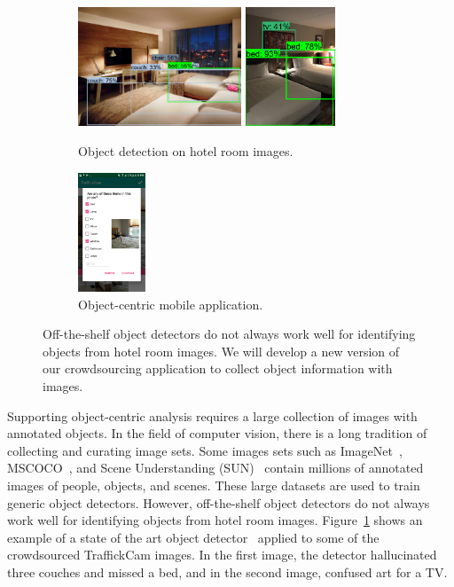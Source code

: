 \documentclass[12pt]{article}
\begin{document}
\begin{figure}
\centering
\begin{subfigure}[b]{3.5in}
\centering
\includegraphics[height=1.4in]{figs/badObjects/example0.png}
\includegraphics[height=1.4in]{figs/badObjects/example1.png}
\caption{Object detection on hotel room images.}
\label{fig:badObjects}
\end{subfigure}
\begin{subfigure}[b]{2.5in}
\centering
\includegraphics[height=1.4in]{figs/tCamVer2.jpg}
\caption{Object-centric mobile application.}
\label{fig:appVer2}
\end{subfigure}
\caption[Limitations of off-the-shelf object detectors]{Off-the-shelf object detectors do not always work well for identifying objects from hotel room images. We will develop a new version of our crowdsourcing application to collect object information with images.}
\label{fig:objectCentric2}
\end{figure}

Supporting object-centric analysis requires a large collection of images with annotated objects. In the field of computer vision, there is a long tradition of collecting and curating image sets. Some images sets such as ImageNet~\cite{imagenet_cvpr09},  
MSCOCO~\cite{DBLP:journals/corr/LinMBHPRDZ14}, and Scene Understanding (SUN)~\cite{xiao2010sun} contain millions of annotated images of people, objects, and scenes. These large datasets are used to train generic object detectors. However, off-the-shelf object detectors do not always work well for identifying objects from hotel room images. Figure~\ref{fig:badObjects} shows an example of a state of the art object detector~\cite{DBLP:journals/corr/LiuAESR15} applied to some of the crowdsourced TraffickCam images. In the first image, the detector hallucinated three couches and missed a bed, and in the second image, confused art for a TV. 
\end{document}

